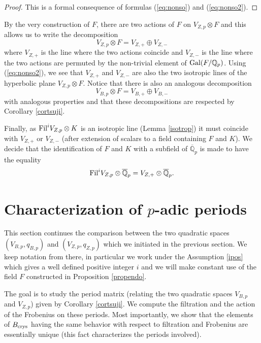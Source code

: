 \documentclass[11pt]{amsart}
\begin{document}
\begin{proof}
This is a formal consequence of  formulas (\ref{eq:nonso}) and (\ref{eq:nonso2}).
\end{proof}
\begin{remark}\label{conventionF}
By the very construction of $F$, there are two actions of $F$ on  $V_{Z,p}\otimes F$ and this allows us to write the decomposition
\[V_{Z,p}\otimes F= V_{Z,+}  \oplus  V_{Z,-}\]
where $V_{Z,+}$ is the line where the two actions coincide and $V_{Z,-}$ is the line where the two actions are permuted by the non-trivial element of $\textnormal{Gal}(F/\mathbb{Q}_p)$. Using (\ref{eq:nonso2}), we see that $V_{Z,+}$ and $V_{Z,-}$ are also the two isotropic lines of the hyperbolic plane $V_{Z,p}\otimes F$. Notice that there is also an analogous decomposition
\[V_{B,p}\otimes F= V_{B,+} \oplus V_{B,-}\]
with analogous properties and that these decompositions are respected by Corollary \ref{cortsuji}. 

Finally, as $\textnormal{Fil}^i V_{Z,p}\otimes K$ is an isotropic line (Lemma \ref{isotrop}) it must coincide with $V_{Z,+}$ or  $V_{Z,-}$ (after extension of scalars to a field containing $F$ and $K$). We decide that the identification of $F$ and $K$ with a subfield of $\overline{\mathbb{Q}}_p$ is made to have the equality
\[\textnormal{Fil}^i V_{Z,p}\otimes  \overline{\mathbb{Q}}_p = V_{Z,+} \otimes  \overline{\mathbb{Q}}_p.\]  
\end{remark}




\section{Characterization of  $p$-adic periods}\label{p-adic periods}
This section continues the comparison between the two quadratic spaces
$(V_{B,p},q_{B,p})$ and  $(V_{Z,p},q_{Z,p})$ which we initiated in the previous section. We keep notation from there, in particular we work under the Assumption \ref{ipos} which gives a well defined positive integer $i$ and we will make constant use of the field $F$  constructed in  Proposition \ref{propendo}.

The goal is to study the period matrix (relating  the two quadratic spaces $V_{B,p}$ and $V_{Z,p}$) given by Corollary \ref{cortsuji}. 
We compute  the filtration and the action of the Frobenius on these periods. Most importantly, we show that the elements of $B_{\textnormal{crys}}$ having the same behavior with respect to filtration and Frobenius are essentially unique (this fact characterizes the periods involved).
\end{document}

